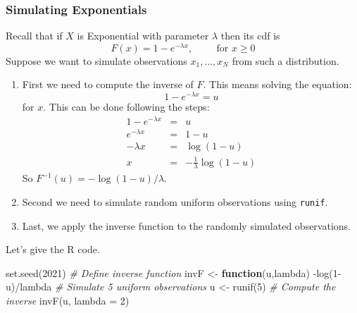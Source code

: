 \documentclass[
]{book}
\newenvironment{Shaded}{\begin{snugshade}}{\end{snugshade}}
\newcommand{\AttributeTok}[1]{\textcolor[rgb]{0.77,0.63,0.00}{#1}}
\newcommand{\CommentTok}[1]{\textcolor[rgb]{0.56,0.35,0.01}{\textit{#1}}}
\newcommand{\ControlFlowTok}[1]{\textcolor[rgb]{0.13,0.29,0.53}{\textbf{#1}}}
\newcommand{\DecValTok}[1]{\textcolor[rgb]{0.00,0.00,0.81}{#1}}
\newcommand{\FunctionTok}[1]{\textcolor[rgb]{0.00,0.00,0.00}{#1}}
\newcommand{\NormalTok}[1]{#1}
\newcommand{\OtherTok}[1]{\textcolor[rgb]{0.56,0.35,0.01}{#1}}
\newcommand{\SpecialCharTok}[1]{\textcolor[rgb]{0.00,0.00,0.00}{#1}}
\theoremstyle{definition}
\theoremstyle{definition}
\theoremstyle{definition}
\theoremstyle{definition}
\theoremstyle{remark}
\begin{document}
\hypertarget{simulating-exponentials}{%
\subsubsection{Simulating Exponentials}\label{simulating-exponentials}}

Recall that if \(X\) is Exponential with parameter \(\lambda\) then its cdf is
\[
F(x)= 1- e^{-\lambda x}, \hspace{1cm} \mbox{for } x\geq 0
\]
Suppose we want to simulate observations \(x_1,\dots,x_N\) from such a distribution.

\begin{enumerate}
\def\labelenumi{\arabic{enumi}.}
\item
  First we need to compute the inverse of \(F\). This means solving the equation:
  \[
  1-e^{-\lambda x} = u
  \]
  for \(x\). This can be done following the steps:
  \begin{eqnarray*}
  1-e^{-\lambda x} &=& u\\
  e^{-\lambda x} &=& 1 - u\\
  -\lambda x &=& \log(1-u)\\
  x &=& -\frac{1}{\lambda}\log(1-u)
  \end{eqnarray*}
  So \(F^{-1}(u)=-\log(1-u)/\lambda\).
\item
  Second we need to simulate random uniform observations using \texttt{runif}.
\item
  Last, we apply the inverse function to the randomly simulated observations.
\end{enumerate}

Let's give the R code.

\begin{Shaded}
\begin{Highlighting}[]
\FunctionTok{set.seed}\NormalTok{(}\DecValTok{2021}\NormalTok{)}
\CommentTok{\# Define inverse function}
\NormalTok{invF }\OtherTok{\textless{}{-}} \ControlFlowTok{function}\NormalTok{(u,lambda) }\SpecialCharTok{{-}}\FunctionTok{log}\NormalTok{(}\DecValTok{1}\SpecialCharTok{{-}}\NormalTok{u)}\SpecialCharTok{/}\NormalTok{lambda}
\CommentTok{\# Simulate 5 uniform observations}
\NormalTok{u }\OtherTok{\textless{}{-}} \FunctionTok{runif}\NormalTok{(}\DecValTok{5}\NormalTok{)}
\CommentTok{\# Compute the inverse }
\FunctionTok{invF}\NormalTok{(u, }\AttributeTok{lambda =} \DecValTok{2}\NormalTok{)}
\end{Highlighting}
\end{Shaded}
\end{document}
